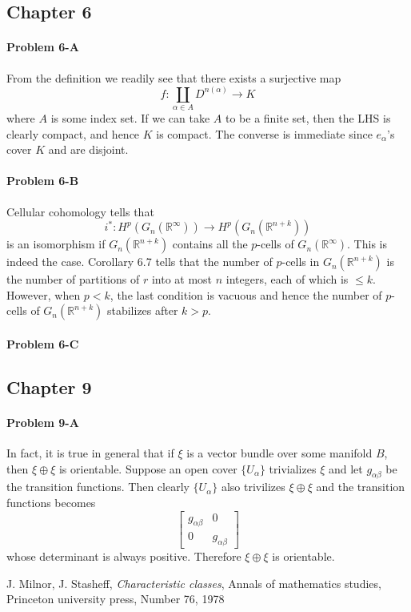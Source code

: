 \documentclass[12pt]{article}
\theoremstyle{plain}
\theoremstyle{definition}
\newcommand{\IR}{\mathbb{R}}
\newcommand{\<}{\langle}
\renewcommand{\>}{\rangle}
\begin{document}
\subsection*{Chapter 6}
\paragraph{Problem 6-A}
From the definition we readily see that there exists a surjective map 
$$ f : \coprod_{\alpha \in A} D^{n(\alpha)} \to K $$ where $A$ is some index set. If we can take $A$ to be a finite set, then the LHS is clearly compact, and hence $K$ is compact. The converse is immediate since $e_\alpha$'s cover $K$ and are disjoint. 

\paragraph{Problem 6-B}
Cellular cohomology tells that $$ i^* : H^p(G_n(\IR^\infty)) \to H^p(G_n(\IR^{n + k})) $$
is an isomorphism if $G_n(\IR^{n + k})$  contains all the $p$-cells of $G_n(\IR^\infty)$. This is indeed the case. Corollary 6.7 tells that the number of $p$-cells in $G_n(\IR^{n + k})$ is the number of partitions of $r$ into at most $n$ integers, each of which is $\le k$. However, when $p < k$, the last condition is vacuous and hence the number of $p$-cells of $G_n(\IR^{n + k})$ stabilizes after $k > p$. 

\paragraph{Problem 6-C}


\subsection*{Chapter 9}
\paragraph{Problem 9-A}
In fact, it is true in general that if $\xi$ is a vector bundle over some manifold $B$, then $\xi \oplus \xi$ is orientable. Suppose an open cover $\{ U_\alpha \}$ trivializes $\xi$ and let $g_{\alpha \beta}$ be the transition functions. Then clearly $\{U_\alpha\}$ also trivilizes $\xi \oplus \xi$ and the transition functions becomes 
$$ \begin{bmatrix}
g_{\alpha \beta } & 0 \\ 0 & g_{\alpha \beta} 
\end{bmatrix}$$ whose determinant is always positive. Therefore $\xi \oplus \xi$ is orientable.  



\begin{thebibliography}{9}


  J. Milnor, J. Stasheff, \textit{Characteristic classes}, Annals of mathematics studies, Princeton university press, Number 76, 1978
\end{thebibliography}
\end{document}
